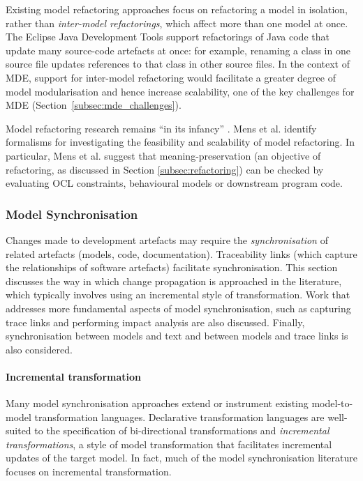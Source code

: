  
Existing model refactoring approaches focus on refactoring a model in isolation, rather than \emph{inter-model refactorings}, which affect more than one model at once. The Eclipse Java Development Tools support refactorings of Java code that update many source-code artefacts at once: for example, renaming a class in one source file updates references to that class in other source files. In \cc the context of MDE, support for inter-model refactoring would facilitate a greater degree of model modularisation and hence increase scalability, one of the key challenges for MDE \cite{kolovos08scalability} (Section~\ref{subsec:mde_challenges}).

Model \cc refactoring research remains ``in its infancy'' \cite{mens07modelrefactoring}. Mens et al. identify formalisms for investigating the feasibility and scalability of model refactoring. In particular, Mens et al. suggest that meaning-preservation (an objective of refactoring, as discussed in Section \ref{subsec:refactoring}) can be checked by evaluating OCL constraints, behavioural models or downstream program code.


\subsubsection{Model Synchronisation}
\label{subsubsec:model_synch}
Changes made to development artefacts may require the \emph{synchronisation} of related artefacts (models, code, documentation). Traceability links (which capture the relationships of software artefacts) facilitate synchronisation. This section discusses the way in which change propagation is approached in the literature, which typically involves using an incremental style of transformation. Work that addresses more fundamental aspects of model synchronisation, such as capturing trace links and performing impact analysis are also discussed. Finally, synchronisation between models and text and between models and trace links is also considered.

\paragraph{Incremental transformation}
Many model synchronisation approaches extend or instrument existing model-to-model transformation languages. Declarative transformation languages are well-suited to the specification of bi-direct\-io\-nal transformations and \emph{incremental transformations}, a style of model transformation that facilitates incremental updates of the target model. In fact, much of the model synchronisation literature focuses on incremental transformation. 

